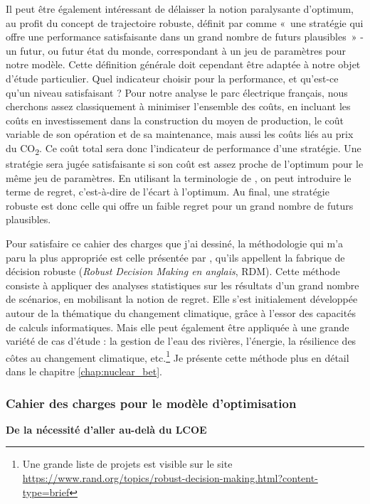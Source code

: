 Il peut être également intéressant de délaisser la notion paralysante d’optimum, au profit du concept de trajectoire robuste, définit par \citet{Lempert2006} comme «~une stratégie qui offre une performance satisfaisante dans un grand nombre de futurs plausibles~» - un futur, ou futur état du monde, correspondant à un jeu de paramètres pour notre modèle.
Cette définition générale doit cependant être adaptée à notre objet d’étude particulier. Quel indicateur choisir pour la performance, et qu’est-ce qu’un niveau satisfaisant ?
Pour notre analyse le parc électrique français, nous cherchons assez classiquement à minimiser l'ensemble des coûts, en incluant les coûts en investissement dans la construction du moyen de production, le coût variable de son opération et de sa maintenance, mais aussi les coûts liés au prix du CO\textsubscript{2}. Ce coût total sera donc l’indicateur de performance d’une stratégie.
Une stratégie sera jugée satisfaisante si son coût est assez proche de l’optimum pour le même jeu de paramètres. En utilisant la terminologie de \citet{Savage1950}, on peut introduire le terme de regret, c’est-à-dire de l’écart à l’optimum. Au final, une stratégie robuste est donc celle qui offre un faible regret pour un grand nombre de futurs plausibles.

Pour satisfaire ce cahier des charges que j’ai dessiné, la méthodologie qui m’a paru la plus appropriée est celle présentée par  \citet{Lempert2006}, qu’ils appellent la fabrique de décision robuste (\textit{Robust Decision Making en anglais}, RDM). Cette méthode consiste à appliquer des analyses statistiques sur les résultats d’un grand nombre de scénarios, en mobilisant la notion de regret. Elle s’est initialement développée autour de la thématique du changement climatique, grâce à l’essor des capacités de calculs informatiques. Mais elle peut également être appliquée à une grande variété de cas d’étude : la gestion de l’eau des rivières, l’énergie, la résilience des côtes au changement climatique, etc.\footnote{Une grande liste de projets est visible sur le site \url{https://www.rand.org/topics/robust-decision-making.html?content-type=brief}} Je présente cette méthode plus en détail dans le chapitre \ref{chap:nuclear_bet}.
	
\subsubsection{Cahier des charges pour le modèle d’optimisation}

\textbf{De la nécessité d’aller au-delà du LCOE}

